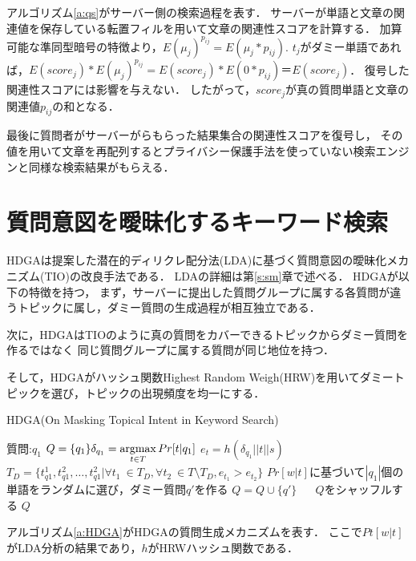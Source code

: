 \documentclass[master]{suribt}
\theoremstyle{definition}
\newcommand{\argmax}{\mathop{\rm argmax}\limits}
\begin{document}
 アルゴリズム\ref{a:qs}がサーバー側の検索過程を表す．
 サーバーが単語と文章の関連値を保存している転置フィルを用いて文章の関連性スコアを計算する．
 加算可能な準同型暗号の特徴より，$E(\mu_j)^{p_{ij}}=E(\mu_j*p_{ij})$.
 $t_j$がダミー単語であれば，$E(score_j)*E(\mu_j)^{p_{ij}}=E(score_j)*E(0*p_{ij})＝E(score_j)$．
 復号した関連性スコアには影響を与えない．
 したがって，$score_j$が真の質問単語と文章の関連値$p_{ij}$の和となる．

 最後に質問者がサーバーがらもらった結果集合の関連性スコアを復号し，
 その値を用いて文章を再配列するとプライバシー保護手法を使っていない検索エンジンと同様な検索結果がもらえる．

 \section{質問意図を曖昧化するキーワード検索}

 HDGAは\cite{toi2012}提案した潜在的ディリクレ配分法(LDA)\cite{lda2003}に基づく質問意図の曖昧化メカニズム(TIO)の改良手法である．
 LDAの詳細は第\ref{s:sm}章で述べる．
 HDGAが以下の特徴を持つ，
 まず，サーバーに提出した質問グループに属する各質問が違うトピックに属し，ダミー質問の生成過程が相互独立である．

 次に，HDGAはTIOのように真の質問をカバーできるトピックからダミー質問を作るではなく
 同じ質問グループに属する質問が同じ地位を持つ．

 そして，HDGAがハッシュ関数Highest Random Weigh(HRW)\cite{hrw1998}を用いてダミートピックを選び，トピックの出現頻度を均一にする．

 \begin{algorithm}
 \caption{HDGA(On Masking Topical Intent in Keyword Search)}
 \begin{algorithmic}[1]
  \Require 質問:$q_1$
  \State $Q = \{q_1\}\delta_{q_1} = \argmax_{t \in T} Pr[t|q_1]$
  \State $e_t = h(\delta_{q_1}||t||s)$
  \EndFor
  \State $T_D = \{t^1_{q1},t^2_{q1}, \dots , t^2_{q1} | \forall t_1 \ \in T_D , \forall t_2 \ \in T \setminus T_D, e_{t_1} > e_{t_2} \}$
  \While { $ \argmax_{t \in T} Pr[t|q'] \neq t$}
  \State $Pr[w|t]$に基づいて$|q_1|$個の単語をランダムに選び，ダミー質問$q'$を作る
  \EndWhile
  \State $Q = Q \cup \{q'\}$
  \EndFor　
  \State $Q$をシャッフルする
  \Ensure $Q$
 \end{algorithmic}
 \label{a:HDGA}
 \end{algorithm}

 アルゴリズム\ref{a:HDGA}がHDGAの質問生成メカニズムを表す．
 ここで$Pt[w|t]$がLDA分析の結果であり，$h$がHRWハッシュ関数である．
\end{document}
